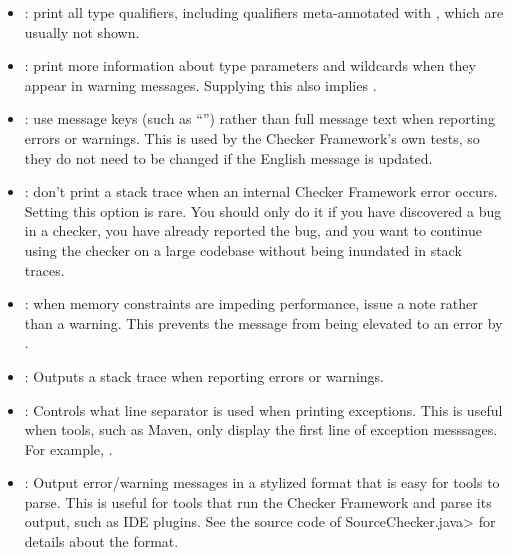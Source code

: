 \begin{itemize}
\item {}: print all type qualifiers, including
qualifiers meta-annotated with
, which are
usually not shown.

\item {}: print more information about type
  parameters and wildcards when they appear in warning messages.  Supplying
  this also implies .

\item {}: use message keys (such as ``'')
rather than full message text when reporting errors or warnings.  This is
used by the Checker Framework's own tests, so they do not need to be
changed if the English message is updated.

\item {}: don't print a stack trace when an
internal Checker Framework error occurs.  Setting this option is rare.  You
should only do it if you have discovered a bug in a checker, you have
already reported the bug, and you want to continue using the checker on a
large codebase without being inundated in stack traces.

\item {}: when memory constraints are
impeding performance, issue a note rather than a warning.
This prevents the message from being elevated to an error by .

\item {}: Outputs a stack trace when reporting errors or warnings.

\item {}: Controls what line separator is used when printing exceptions.
This is useful when tools, such as Maven, only display the first line of exception messsages. For
example, .

\end{itemize}



\begin{itemize}

\item {}: Output error/warning messages in a
  stylized format that is easy for tools to parse.  This is useful for
  tools that run the Checker Framework and parse its output, such as IDE
  plugins.  See the source code of \<SourceChecker.java> for details about
  the format.

\end{itemize}

